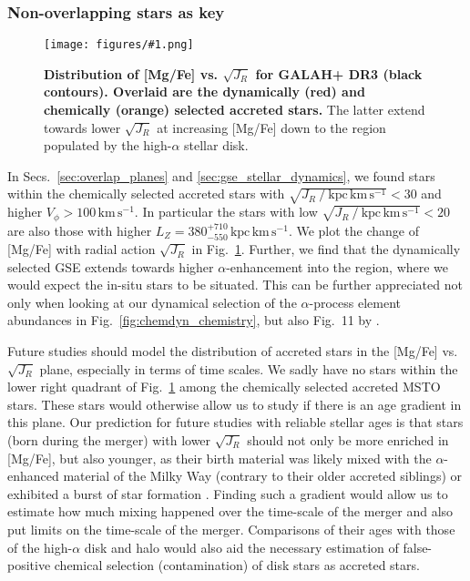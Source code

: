 \documentclass[fleqn,usenatbib]{mnras}
\newcommand{\kpckms}{\,\mathrm{kpc\,km\,s^{-1}}}	%
\newcommand{\codeicon}{{\faCloudDownload}}
\newcommand{\codelink}[1]{\href{https://github.com/svenbuder/Accreted-stars-in-GALAH-DR3/tree/main/figures/#1.ipynb}{\codeicon}\,\,}
\newcommand{\oscaption}[2]{\caption{#2 \codelink{#1}}}
\newcommand{\figurecolumnwidth}[3]{\begin{figure} \centering \texttt{[image: figures/\#1.png]}\oscaption{#2}{#3}\label{fig:#1} \end{figure}}
\begin{document}
\subsubsection{Non-overlapping stars as key} \label{sec:non_overlap}

\figurecolumnwidth{overlap_mgfe_sqrtjr}{chronochemodynamic_comparison}{
\textbf{Distribution of [Mg/Fe] vs. $\sqrt{J_R}$ for GALAH+ DR3 (black contours). Overlaid are the dynamically (red) and chemically (orange) selected accreted stars.} The latter extend towards lower $\sqrt{J_R}$ at increasing [Mg/Fe] down to the region populated by the high-$\alpha$ stellar disk.
}

In Secs.~\ref{sec:overlap_planes} and \ref{sec:gse_stellar_dynamics}, we found stars within the chemically selected accreted stars with $\sqrt{J_R~/~\mathrm{kpc\,km\,s^{-1}}} < 30$ and higher $V_\phi > 100\,\mathrm{km\,s^{-1}}$. In particular the stars with low $\sqrt{J_R~/~\mathrm{kpc\,km\,s^{-1}}} < 20$ are also those with higher $L_Z = 380_{-550}^{+710}\kpckms$. We plot the change of [Mg/Fe] with radial action $\sqrt{J_R}$ in Fig.~\ref{fig:overlap_mgfe_sqrtjr}. Further, we find that the dynamically selected GSE extends towards higher $\alpha$-enhancement into the region, where we would expect the in-situ stars to be situated. This can be further appreciated not only when looking at our dynamical selection of the $\alpha$-process element abundances in Fig.~\ref{fig:chemdyn_chemistry}, but also Fig.~11 by \citet{Naidu2020}.

Future studies should model the distribution of accreted stars in the [Mg/Fe] vs. $\sqrt{J_R}$ plane, especially in terms of time scales. We sadly have no stars within the lower right quadrant of Fig.~\ref{fig:overlap_mgfe_sqrtjr} among the chemically selected accreted MSTO stars. These stars would otherwise allow us to study if there is an age gradient in this plane. Our prediction for future studies with reliable stellar ages is that stars (born during the merger) with lower $\sqrt{J_R}$ should not only be more enriched in [Mg/Fe], but also younger, as their birth material was likely mixed with the $\alpha$-enhanced material of the Milky Way (contrary to their older accreted siblings) or exhibited a burst of star formation \citep{GilmoreWyse1991}. Finding such a gradient would allow us to estimate how much mixing happened over the time-scale of the merger and also put limits on the time-scale of the merger. Comparisons of their ages with those of the high-$\alpha$ disk and halo would also aid the necessary estimation of false-positive chemical selection (contamination) of disk stars as accreted stars.
\end{document}
